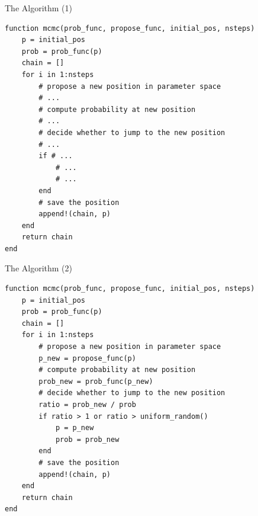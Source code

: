 \documentclass{beamer}
\begin{document}
% 


\begin{frame}[fragile]{The Algorithm (1)}
\begin{footnotesize}
\begin{verbatim}
function mcmc(prob_func, propose_func, initial_pos, nsteps)
    p = initial_pos
    prob = prob_func(p)
    chain = []
    for i in 1:nsteps
        # propose a new position in parameter space
        # ...
        # compute probability at new position
        # ...
        # decide whether to jump to the new position
        # ...
        if # ...
            # ...
            # ...
        end
        # save the position
        append!(chain, p)
    end
    return chain
end
\end{verbatim}
\end{footnotesize}
\end{frame}

\begin{frame}[fragile]{The Algorithm (2)}
\begin{footnotesize}
\begin{verbatim}
function mcmc(prob_func, propose_func, initial_pos, nsteps)
    p = initial_pos
    prob = prob_func(p)
    chain = []
    for i in 1:nsteps
        # propose a new position in parameter space
        p_new = propose_func(p)
        # compute probability at new position
        prob_new = prob_func(p_new)
        # decide whether to jump to the new position
        ratio = prob_new / prob
        if ratio > 1 or ratio > uniform_random()
            p = p_new
            prob = prob_new
        end
        # save the position
        append!(chain, p)
    end
    return chain
end
\end{verbatim}
\end{footnotesize}
\end{frame}
\end{document}
